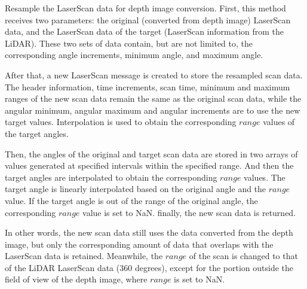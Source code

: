 Resample the LaserScan data for depth image conversion. 
First, this method receives two parameters: the original (converted from depth image) LaserScan data, 
and the LaserScan data of the target (LaserScan information from the LiDAR). 
These two sets of data contain, but are not limited to, 
the corresponding angle increments, minimum angle, and maximum angle.

After that, a new LaserScan message is created to store the resampled scan data. 
The header information, time increments, scan time, minimum and maximum ranges of the new scan data 
remain the same as the original scan data, 
while the angular minimum, angular maximum and angular increments are to use the new target values. 
Interpolation is used to obtain the corresponding $range$ values of the target angles.

Then, the angles of the original and target scan data are stored 
in two arrays of values generated at specified intervals within the specified range. 
And then the target angles are interpolated to obtain the corresponding $range$ values. 
The target angle is linearly interpolated based on the original angle and the $range$ value. 
If the target angle is out of the range of the original angle, 
the corresponding $range$ value is set to NaN. finally, the new scan data is returned.

In other words, the new scan data still uses the data converted from the depth image, 
but only the corresponding amount of data that overlaps with the LaserScan data is retained. 
Meanwhile, the $range$ of the scan is changed to that of the LiDAR LaserScan data (360 degrees), 
except for the portion outside the field of view of the depth image, where $range$ is set to NaN.

